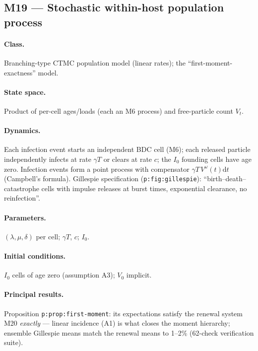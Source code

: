 \documentclass[11pt,a4paper]{article}
\newcommand{\dd}{\mathrm{d}}
\begin{document}
\subsection{M19 --- Stochastic within-host population process}

\paragraph{Class.} Branching-type CTMC population model (linear rates);
the ``first-moment-exactness'' model.

\paragraph{State space.} Product of per-cell ages/loads (each an M6
process) and free-particle count $V_t$.

\paragraph{Dynamics.} Each infection event starts an independent BDC cell
(M6); each released particle independently infects at rate $\gamma T$ or
clears at rate $c$; the $I_0$ founding cells have age zero. Infection
events form a point process with compensator $\gamma T\,V^{\omega}(t)\dd t$
(Campbell's formula). Gillespie specification (\texttt{p:fig:gillespie}):
``birth--death--catastrophe cells with impulse releases at burst times,
exponential clearance, no reinfection''.

\paragraph{Parameters.} $(\lambda,\mu,\delta)$ per cell; $\gamma T$, $c$;
$I_0$.

\paragraph{Initial conditions.} $I_0$ cells of age zero (assumption A3);
$V_0$ implicit.

\paragraph{Principal results.} Proposition \texttt{p:prop:first-moment}:
its expectations satisfy the renewal system M20 \emph{exactly} --- linear
incidence (A1) is what closes the moment hierarchy; ensemble Gillespie
means match the renewal means to 1--2\% (62-check verification suite).
\end{document}
